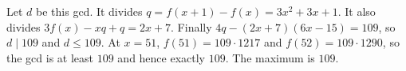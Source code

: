 Let $d$ be this gcd. It divides $q=f(x+1)-f(x)=3x^2+3x+1$. It also divides $3f(x)-xq+q=2x+7$. Finally $4q-(2x+7)(6x-15)=109$, so $d\mid109$ and $d\le109$. At $x=51$, $f(51)=109\cdot1217$ and $f(52)=109\cdot1290$, so the gcd is at least $109$ and hence exactly $109$. The maximum is $\boxed{109}$.
